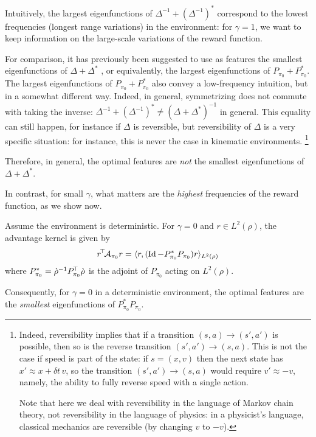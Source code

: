 \documentclass[11pt,a4paper]{article}
\newcommand{\AK}{\mathcal{A}}
\newcommand{\drho}{\grave \rho}
\begin{document}
Intuitively, the largest eigenfunctions of
$\Delta^{-1}+(\Delta^{-1})^\ast$ correspond to the lowest frequencies
(longest range variations) in the environment: for $\gamma=1$, we want to keep
information on the large-scale variations of the reward function.

For comparison, it has previously been suggested to use as features the smallest
eigenfunctions of $\Delta+\Delta^\ast$ \cite{wu2018laplacian}, or equivalently, the largest
eigenfunctions of $P_{\pi_0}+P_{\pi_0}^\ast$.
The largest
eigenfunctions of $P_{\pi_0}+P_{\pi_0}^\ast$ also convey a low-frequency
intuition,
but in a somewhat different way. Indeed, in general, symmetrizing does
not commute with taking the inverse: $\Delta^{-1}+(\Delta^{-1})^\ast\neq
(\Delta+\Delta^\ast)^{-1}$ in general. This equality can still happen,
for instance if $\Delta$ is reversible, but reversibility of $\Delta$ is
a very specific situation: for instance, this is never the case in
kinematic environments. \footnote{Indeed, reversibility implies that if a
transition $(s,a)\to (s',a')$ is possible, then so is the reverse
transition $(s',a')\to (s,a)$. This is not the case if speed is part of
the state: if $s=(x,v)$ then the next state has $x'\approx x+\delta t\, v$, so the transition
$(s',a')\to (s,a)$ would require $v'\approx -v$, namely, the ability to
fully reverse speed with a single action.

Note that here we deal with
reversibility in the language of Markov chain theory, not reversibility in the
language of physics: in a physicist's language, classical mechanics are
reversible (by changing $v$ to $-v$).}

Therefore, in general, the optimal features are \emph{not} the smallest
eigenfunctions of $\Delta+\Delta^\ast$.

\bigskip


In contrast, for small $\gamma$, what matters are the \emph{highest}
frequencies of the reward function, as we show now.

\begin{prop}[ (Optimal features for $\gamma=0$ in a deterministic
environment)]
\label{prop:gamma0}
Assume the environment is deterministic.
For $\gamma=0$ and $r\in L^2(\rho)$, the advantage kernel is given by
\begin{equation}
\transp{r}\AK_{\pi_0}r
=\langle r, (\Id-P_{\pi_0}^\ast P_{\pi_0})r\rangle_{L^2(\rho)}
\end{equation}
where $P_{\pi_0}^\ast=\drho^{-1}\transp{P_{\pi_0}}\,\drho$ is the adjoint
of $P_{\pi_0}$ acting on
$L^2(\rho)$.

Consequently, for $\gamma=0$ in a deterministic environment, the optimal features are the
\emph{smallest}
eigenfunctions of $P_{\pi_0}^\ast P_{\pi_0}$.
\end{prop}
\end{document}
